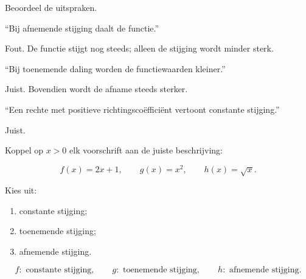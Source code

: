 \documentclass{ximera}
\begin{document}
\begin{oefening}{\oefB\ESS}

Beoordeel de uitspraken.

\begin{question}
``Bij afnemende stijging daalt de functie.''
\begin{oplossing}
Fout. De functie stijgt nog steeds; alleen de stijging wordt minder sterk.
\end{oplossing}
\end{question}

\begin{question}
``Bij toenemende daling worden de functiewaarden kleiner.''
\begin{oplossing}
Juist. Bovendien wordt de afname steeds sterker.
\end{oplossing}
\end{question}

\begin{question}
``Een rechte met positieve richtingscoëfficiënt vertoont constante stijging.''
\begin{oplossing}
Juist.
\end{oplossing}
\end{question}

\end{oefening}


\begin{oefening}{\oefB\ESS}

Koppel op \(x>0\) elk voorschrift aan de juiste beschrijving:

\[
f(x)=2x+1,\qquad
g(x)=x^2,\qquad
h(x)=\sqrt{x}.
\]

Kies uit:
\begin{enumerate}
  \item constante stijging;
  \item toenemende stijging;
  \item afnemende stijging.
\end{enumerate}

\begin{oplossing}
\[
f:\text{ constante stijging},
\qquad
g:\text{ toenemende stijging},
\qquad
h:\text{ afnemende stijging}.
\]
\end{oplossing}

\end{oefening}


\end{document}
